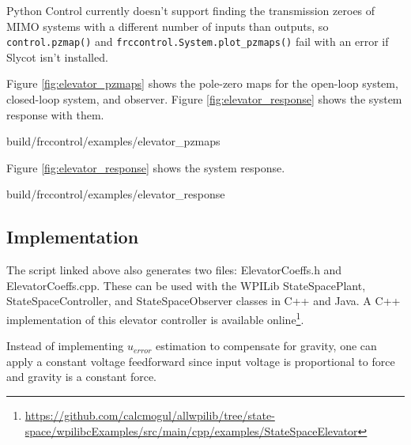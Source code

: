 \begin{remark}
  Python Control currently doesn't support finding the transmission zeroes of
  MIMO \glspl{system} with a different number of \glspl{input} than
  \glspl{output}, so \texttt{control.pzmap()} and
  \texttt{frccontrol.System.plot\_pzmaps()} fail with an error if Slycot isn't
  installed.
\end{remark}

Figure \ref{fig:elevator_pzmaps} shows the pole-zero maps for the open-loop
\gls{system}, closed-loop \gls{system}, and \gls{observer}. Figure
\ref{fig:elevator_response} shows the \gls{system} response with them.

\begin{svg}{build/frccontrol/examples/elevator_pzmaps}
  \caption{Elevator pole-zero maps}
  \label{fig:elevator_pzmaps}
\end{svg}

Figure \ref{fig:elevator_response} shows the \gls{system} response.

\begin{svg}{build/frccontrol/examples/elevator_response}
  \caption{Elevator response}
  \label{fig:elevator_response}
\end{svg}

\subsection{Implementation}

The script linked above also generates two files: ElevatorCoeffs.h and
ElevatorCoeffs.cpp. These can be used with the WPILib StateSpacePlant,
StateSpaceController, and StateSpaceObserver classes in C++ and Java. A C++
implementation of this elevator controller is available online\footnote{
\url{https://github.com/calcmogul/allwpilib/tree/state-space/wpilibcExamples/src/main/cpp/examples/StateSpaceElevator}}.

\begin{remark}
  Instead of implementing $u_{error}$ estimation to compensate for gravity, one
  can apply a constant voltage feedforward since input voltage is proportional
  to force and gravity is a constant force.
\end{remark}
